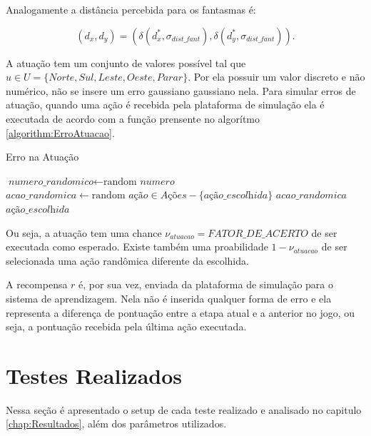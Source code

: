 Analogamente a distância percebida para os fantasmas é:

\begin{equation}
	\left( d_x, d_y \right) = \left( \delta\left( d_x^*, \sigma_{dist\_fant} \right), \delta\left( d_y^*, \sigma_{dist\_fant} \right) \right).
\end{equation}

A atuação tem um conjunto de valores possível tal que $ u \in U = \{ Norte,\allowbreak Sul,\allowbreak Leste,\allowbreak Oeste,\allowbreak Parar \} $. Por ela possuir um valor discreto e não numérico, não se insere um erro gaussiano gaussiano nela. Para simular erros de atuação, quando uma ação é recebida pela plataforma de simulação ela é executada de acordo com a função prensente no algorítmo \ref{algorithm:ErroAtuacao}.

\begin{algorithm}[h]
	\caption{Erro na Atuação} \label{algorithm:ErroAtuacao}
	\begin{algorithmic}[1]
			\State $\textit{numero\_randomico} \gets \text{random }\textit{numero}$
				\State $\textit{acao\_randomica} \gets \text{random }\textit{ação} \in \textit{Ações}-\textit{\{ação\_escolhida\}}$
				\State \Return $\textit{acao\_randomica}$
			\Else
				\State \Return $\textit{ação\_escolhida}$
			\EndIf
		\EndProcedure
	\end{algorithmic}
\end{algorithm}

Ou seja, a atuação tem uma chance $ \nu_{atuacao} = \textit{FATOR\_DE\_ACERTO} $ de ser executada como esperado. Existe também uma proabilidade $ 1 - \nu_{atuacao} $ de ser selecionada uma ação randômica diferente da escolhida.

A recompensa $ r $ é, por sua vez, enviada da plataforma de simulação para o sistema de aprendizagem. Nela não é inserida qualquer forma de erro e ela representa a diferença de pontuação entre a etapa atual e a anterior no jogo, ou seja, a pontuação recebida pela última ação executada.


\section{Testes Realizados} \label{section:TestesRealizados}

Nessa seção é apresentado o setup de cada teste realizado e analisado no capitulo \ref{chap:Resultados}, além dos parâmetros utilizados.

